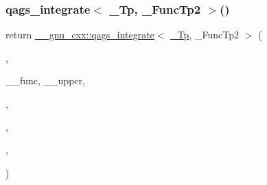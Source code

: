 \subsubsection{\texorpdfstring{qags\+\_\+integrate$<$ \+\_\+\+Tp, \+\_\+\+Func\+Tp2 $>$()}{qags\_integrate< \_Tp, \_FuncTp2 >()}\hspace{0.1cm}{\footnotesize\ttfamily [3/4]}}
{\footnotesize\ttfamily return \hyperlink{namespace____gnu__cxx_afde6c192a4e11d49f4c9c117277980ff}{\+\_\+\+\_\+gnu\+\_\+cxx\+::qags\+\_\+integrate}$<$ \hyperlink{namespace____gnu__cxx_a3b19a9c800ca194374ef9172290f7d79}{\+\_\+\+Tp}, \+\_\+\+Func\+Tp2 $>$ (\begin{DoxyParamCaption}\item[{\+\_\+\+\_\+workspace}]{,  }\item[{\hyperlink{struct____gnu__cxx_1_1map__minf__b}{map\+\_\+minf\+\_\+b}$<$ \hyperlink{namespace____gnu__cxx_a3b19a9c800ca194374ef9172290f7d79}{\+\_\+\+Tp}, \+\_\+\+Func\+Tp $>$}]{\+\_\+\+\_\+func, \+\_\+\+\_\+upper,  }\item[{\hyperlink{namespace____gnu__cxx_a3b19a9c800ca194374ef9172290f7d79}{\+\_\+\+Tp}\{0\}}]{,  }\item[{\hyperlink{namespace____gnu__cxx_a3b19a9c800ca194374ef9172290f7d79}{\+\_\+\+Tp}\{1\}}]{,  }\item[{\+\_\+\+\_\+max\+\_\+abs\+\_\+err}]{,  }\item[{\+\_\+\+\_\+max\+\_\+rel\+\_\+err}]{ }\end{DoxyParamCaption})}

\mbox{\label{namespace____gnu__cxx_ae5530a44e048f341ccc448df258d49d3}} 
